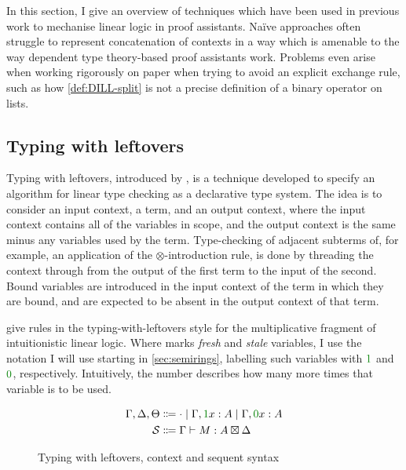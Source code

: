 In this section, I give an overview of techniques which have been used in
previous work to mechanise linear logic in proof assistants.
Na\"{i}ve approaches often struggle to represent concatenation of contexts in a
way which is amenable to the way dependent type theory-based proof assistants
work.
Problems even arise when working rigorously on paper when trying to avoid an
explicit exchange rule, such as how \cref{def:DILL-split} is not a precise
definition of a binary operator on lists.

\subsection{Typing with leftovers}

Typing with leftovers, introduced by \citet{allais17}, is a technique developed
to specify an algorithm for linear type checking as a declarative type system.
The idea is to consider an input context, a term, and an output context, where
the input context contains all of the variables in scope, and the output
context is the same minus any variables used by the term.
Type-checking of adjacent subterms of, for example, an application of
the $\otimes$-introduction rule, is done by
threading the context through from the output of the first term to the input of
the second.
Bound variables are introduced in the input context of the term in which they
are bound, and are expected to be absent in the output context of that term.

 give rules in the typing-with-leftovers style for
the multiplicative fragment of intuitionistic linear logic.
Where \citeauthor{allais17} marks \emph{fresh} and \emph{stale} variables, I use
the notation I will use starting in \cref{sec:semirings}, labelling such
variables with $\gr 1$ and $\gr 0$, respectively.
Intuitively, the number describes how many more times that variable is to be
used.

\begin{figure}
  \begin{align*}
    \Gamma, \Delta, \Theta
    &\Coloneqq {\cdot} \mid \Gamma, \gr1x : A \mid \Gamma, \gr0x : A \\
    \mathcal{S} &\Coloneqq \Gamma \vdash M : A \boxtimes \Delta
  \end{align*}
  \caption{Typing with leftovers, context and sequent syntax}
  \label{fig:twl}
\end{figure}

